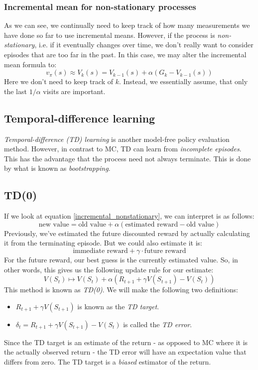 \documentclass[12pt, a4paper]{article}
\numberwithin{equation}{section}
\begin{document}
\subsubsection{Incremental mean for non-stationary processes}
As we can see, we continually need to keep track of how many measurements we have done so far to use incremental means. However, if the process is \textit{non-stationary}, i.e. if it eventually changes over time, we don't really want to consider episodes that are too far in the past. In this case, we may alter the incremental mean formula to:
\begin{equation}
v_\pi(s)\approx V_k(s)=V_{k-1}(s)+\alpha(G_k-V_{k-1}(s))
\label{incremental_nonstationary}
\end{equation}
Here we don't need to keep track of $k$. Instead, we essentially assume, that only the last $1/\alpha$ visits are important.

\subsection{Temporal-difference learning}
\textit{Temporal-difference (TD) learning} is another model-free policy evaluation method. However, in contrast to MC, TD can learn from \textit{incomplete episodes}. This has the advantage that the process need not always terminate. This is done by what is known as \textit{bootstrapping}.

\subsection{TD(0)}
If we look at equation \ref{incremental_nonstationary}, we can interpret is as follows:
\begin{equation}
\textrm{new value}=\textrm{old value}+\alpha(\textrm{estimated reward}-\textrm{old value})
\end{equation}
Previously, we've estimated the future discounted reward by actually calculating it from the terminating episode. But we could also estimate it is:
\begin{equation}
\textrm{immediate reward}+\gamma\cdot\textrm{future reward}
\end{equation}
For the future reward, our best guess is the currently estimated value. So, in other words, this gives us the following update rule for our estimate:
\begin{equation}
V(S_t)\mapsto V(S_t)+\alpha(R_{t+1}+\gamma V(S_{t+1})-V(S_t)) 
\end{equation}
This method is known as \textit{TD(0)}. We will make the following two definitions:
\begin{itemize}
\item $R_{t+1}+\gamma V(S_{t+1})$ is known as the \textit{TD target}.
\item $\delta_t=R_{t+1}+\gamma V(S_{t+1})-V(S_t)$ is called the \textit{TD error}.
\end{itemize}
Since the TD target is an estimate of the return - as opposed to MC where it is the actually observed return - the TD error will have an expectation value that differs from zero. The TD target is a \textit{biased} estimator of the return.
\end{document}
